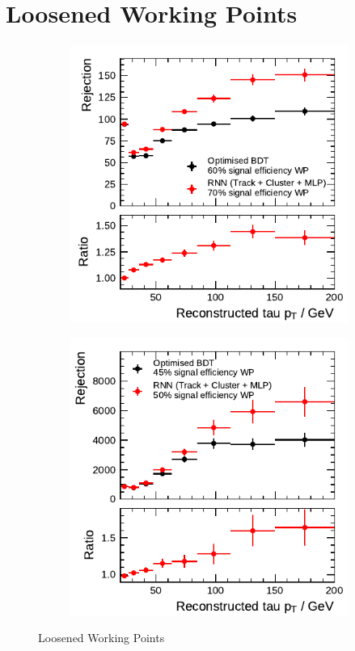\clearpage
\section{Loosened Working Points}
\label{app:loosened_wp}

\begin{figure}[htb]
  \begin{subfigure}[t]{0.48\textwidth}
    \centering
    \includegraphics{./figures/rnn/combined/rnn_loosened_tight_1p.pdf}
  \end{subfigure}\hfill
  \begin{subfigure}[t]{0.48\textwidth}
    \centering
    \includegraphics{./figures/rnn/combined/rnn_loosened_tight_3p.pdf}
  \end{subfigure}
  \caption{Loosened Working Points}
\end{figure}

